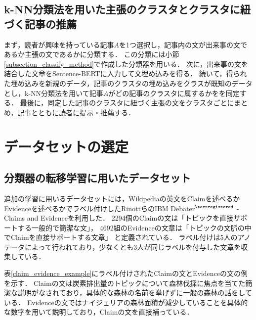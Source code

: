 \documentclass[12pt,a4j,dvipdfmx]{jreport}
\begin{document}
\subsection{k-NN分類法を用いた主張のクラスタとクラスタに紐づく記事の推薦}
まず，読者が興味を持っている記事$A$を1つ選択し，記事内の文が出来事の文であるか主張の文であるかに分類する．
この分類には小節\ref{subsection_classify_method}で作成した分類器を用いる．
次に，出来事の文を結合した文章をSentence-BERTに入力して文埋め込みを得る．
続いて，得られた埋め込みを新規のデータ，記事のクラスタの埋め込みをクラスが既知のデータとし，k-NN分類法を用いて記事$A$がどの記事のクラスタに属するかをを同定する．
最後に，同定した記事のクラスタに紐づく主張の文をクラスタごとにまとめ，記事とともに読者に提示・推薦する．


\section{データセットの選定}
\label{section_select_dataset}

\subsection{分類器の転移学習に用いたデータセット}
追加の学習に用いるデータセットには，Wikipediaの英文をClaimを述べるかEvidenceを述べるかでラベル付けしたRinottらのIBM Debater$^{\textregistered}$ - Claims and Evidenceを利用した\cite{rinott_show_2015}．
2294個のClaimの文は「トピックを直接サポートする一般的で簡潔な文」，
4692組のEvidenceの文章は「トピックの文脈の中でClaimを直接サポートする文章」
と定義されている．
ラベル付けは5人のアノテータによって行われており，少なくとも3人が同じラベルを付与した文章を収集している．

表\ref{claim_evidence_example}にラベル付けされたClaimの文とEvidenceの文の例を示す．
Claimの文は炭素排出量のトピックについて森林伐採に焦点を当てた簡潔な説明がなされており，具体的な森林の名前を挙げずに一般の森林の話をしている．
Evidenceの文ではナイジェリアの森林面積が減少していることを具体的な数字を用いて説明しており，Claimの文を直接補っている．
\end{document}
